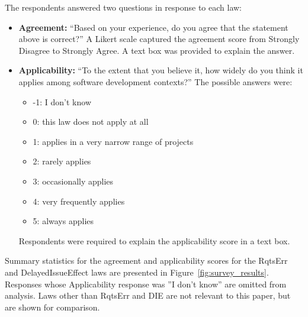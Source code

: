 \documentclass[smallcondensed]{svjour3}
\newcommand{\bi}{\begin{itemize}}%
\newcommand{\ei}{\end{itemize}}
\begin{document}

The respondents answered two questions in response to each law:
\bi
\item
\textbf{Agreement:} ``Based on your experience, do you agree that the statement above is correct?'' A Likert scale captured the agreement score from Strongly Disagree to Strongly Agree. A text box was provided to explain the answer. \newline
\item
\textbf{Applicability:} ``To the extent that you believe it, how widely do you think it applies among software development contexts?'' The possible answers were:
\bi
\item -1: I don't know
\item 0:  this law does not apply at all
 \item 1: applies in a very narrow range of projects  
 \item 2: rarely applies
 \item 3: occasionally applies
\item 4: very frequently applies
\item 5: always applies
\ei
Respondents were required to explain the applicability score in a text box.
\ei

Summary statistics for the agreement and applicability scores for the RqtsErr and DelayedIssueEffect laws are presented in Figure~\ref{fig:survey_results}. Responses whose Applicability response was ''I don't know'' are omitted from analysis. Laws other than RqtsErr and DIE are not relevant to this paper, but are shown for comparison.  
\end{document}
